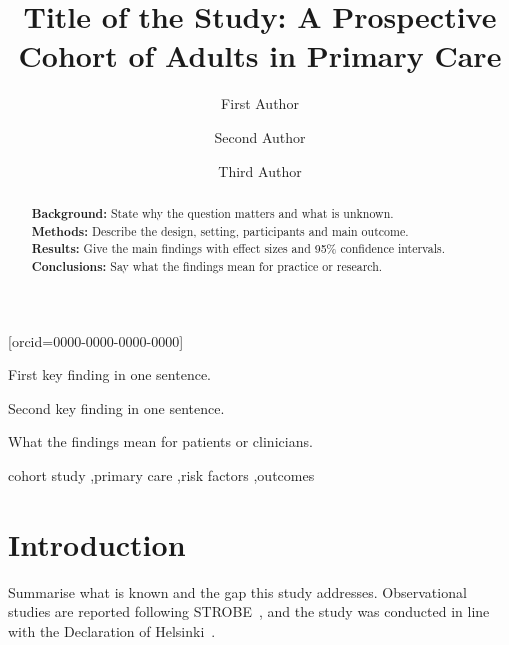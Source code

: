 \documentclass[a4paper,fleqn]{cas-sc}
\begin{document}
\title[mode=title]{Title of the Study: A Prospective Cohort of Adults in Primary Care}

\author[1]{First Author}[orcid=0000-0000-0000-0000]
\cormark[1]

\author[1,2]{Second Author}

\author[2]{Third Author}



\begin{abstract}
\noindent\textbf{Background:} State why the question matters and what is unknown.\\
\textbf{Methods:} Describe the design, setting, participants and main outcome.\\
\textbf{Results:} Give the main findings with effect sizes and 95\% confidence intervals.\\
\textbf{Conclusions:} Say what the findings mean for practice or research.
\end{abstract}

\begin{highlights}
\item First key finding in one sentence.
\item Second key finding in one sentence.
\item What the findings mean for patients or clinicians.
\end{highlights}

\begin{keywords}
cohort study \sep primary care \sep risk factors \sep outcomes
\end{keywords}

\maketitle

\section{Introduction}
Summarise what is known and the gap this study addresses. Observational
studies are reported following STROBE~\cite{vonelm2007strobe}, and the study
was conducted in line with the Declaration of Helsinki~\cite{wma2013helsinki}.
\end{document}
